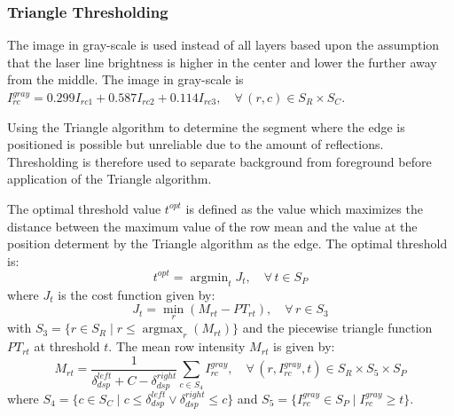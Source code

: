 \documentclass[10pt,letter]{article}
\DeclareMathOperator*{\argmax}{argmax}
\DeclareMathOperator*{\argmin}{argmin}
\begin{document}
\subsubsection{Triangle Thresholding}
The image in gray-scale is used instead of all layers based upon the assumption that the laser line brightness is higher in the center and lower the further away from the middle. The image in gray-scale is $I^{gray}_{rc} = 0.299 I_{rc1} + 0.587 I_{rc2} + 0.114 I_{rc3}, \quad \forall \, (r,c) \in S_R \times S_C$. 

Using the Triangle algorithm to determine the segment where the edge is positioned is possible but unreliable due to the amount of reflections. Thresholding is therefore used to separate background from foreground before application of the Triangle algorithm. 

The optimal threshold value $t^{opt}$ is defined as the value which maximizes the distance between the maximum value of the row mean and the value at the position determent by the Triangle algorithm as the edge. The optimal threshold is:
\begin{equation}
t^{opt} = \argmin_t J_t, \quad \forall \, t \in S_P
\end{equation}
where $J_t$ is the cost function given by:
\begin{equation}
J_t = \min_r (M_{rt} - PT_{rt}), \quad \forall \, r \in S_3
\end{equation}
with $S_3 = \{ r \in S_R \mid r \leq \argmax_r (M_{rt})  \}$ and the piecewise triangle function $PT_{rt}$ at threshold $t$. The mean row intensity $M_{rt}$ is given by:
\begin{equation}
M_{rt} =  \frac{1}{\delta^{left}_{dsp} + C - \delta^{right}_{dsp}}  \sum_{c \in S_4}  I^{gray}_{rc}, \quad \forall \, (r,I^{gray}_{rc},t) \in S_R \times S_5 \times S_P
\end{equation}
where $S_4 = \{c \in S_C \mid c \leq \delta^{left}_{dsp} \lor \delta^{right}_{dsp} \leq c \}$ and $S_5 = \{ I^{gray}_{rc} \in S_P \mid I^{gray}_{rc} \geq t \}$.  
\end{document}
